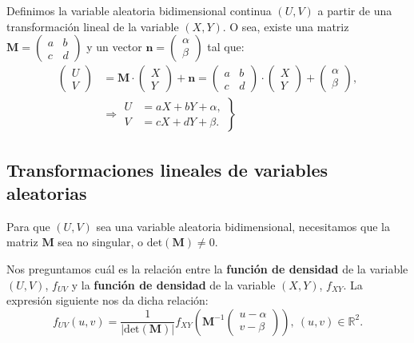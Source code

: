 \documentclass[]{book}
\begin{document}
Definimos la variable aleatoria bidimensional continua \((U,V)\) a partir de una transformación lineal de la variable \((X,Y)\). O sea, existe una matriz \(\mathbf{M}=\begin{pmatrix}a & b\\ c& d\end{pmatrix}\) y un vector \(\mathbf{n}=\begin{pmatrix}\alpha\\\beta \end{pmatrix}\) tal que:
\[
\begin{array}{rl}
\begin{pmatrix}U\\ V\end{pmatrix} & =\mathbf{M}\cdot \begin{pmatrix}X\\ Y\end{pmatrix}+\mathbf{n}=\begin{pmatrix}a & b\\ c& d\end{pmatrix}\cdot\begin{pmatrix}X\\ Y\end{pmatrix}+\begin{pmatrix}\alpha\\\beta \end{pmatrix},\\  & \Rightarrow \left.\begin{array}{rl}U & = aX+bY+\alpha,\\ V & =cX+dY+\beta.\end{array}\right\}
\end{array}
\]

\hypertarget{transformaciones-lineales-de-variables-aleatorias-1}{%
\subsection{Transformaciones lineales de variables aleatorias}\label{transformaciones-lineales-de-variables-aleatorias-1}}

Para que \((U,V)\) sea una variable aleatoria bidimensional, necesitamos que la matriz \(\mathbf{M}\) sea no singular, o \(\mathrm{det}(\mathbf{M})\neq 0\).

Nos preguntamos cuál es la relación entre la \textbf{función de densidad} de la variable \((U,V)\), \(f_{UV}\) y la \textbf{función de densidad} de la variable \((X,Y)\), \(f_{XY}\). La expresión siguiente nos da dicha relación:
\[
f_{UV}(u,v)=\frac{1}{|\mathrm{det}(\mathbf{M})|}f_{XY}\left(\mathbf{M}^{-1}\begin{pmatrix}u-\alpha\\ v-\beta\end{pmatrix}\right), \ (u,v)\in\mathbb{R}^2.
\]
\end{document}
